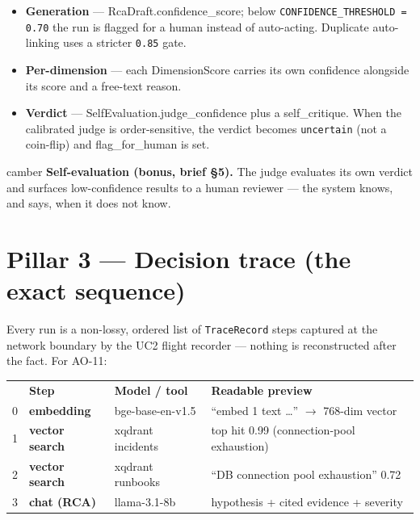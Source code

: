 \documentclass[11pt]{article}
\newcommand{\fld}[1]{{\ttfamily\color{emdark}#1}}
\begin{document}
\begin{itemize}[leftmargin=1.3em,itemsep=2pt]
  \item \textbf{Generation} --- \fld{RcaDraft.confidence\_score}; below
        \texttt{CONFIDENCE\_THRESHOLD = 0.70} the run is flagged for a human instead of
        auto-acting. Duplicate auto-linking uses a stricter \texttt{0.85} gate.
  \item \textbf{Per-dimension} --- each \fld{DimensionScore} carries its own \fld{confidence}
        alongside its score and a free-text \fld{reason}.
  \item \textbf{Verdict} --- \fld{SelfEvaluation.judge\_confidence} plus a \fld{self\_critique}.
        When the calibrated judge is order-sensitive, the verdict becomes \texttt{uncertain}
        (not a coin-flip) and \fld{flag\_for\_human} is set.
\end{itemize}

\begin{notebox}{camber}
\textbf{Self-evaluation (bonus, brief \S5).} The judge evaluates its own verdict and surfaces
low-confidence results to a human reviewer --- the system knows, and says, when it does not know.
\end{notebox}

\section{Pillar 3 --- Decision trace (the exact sequence)}
Every run is a non-lossy, ordered list of \texttt{TraceRecord} steps captured at the network
boundary by the UC2 flight recorder --- nothing is reconstructed after the fact. For AO-11:

\begin{center}
\begin{tabular}{@{}c >{\bfseries}p{2.7cm} p{4.0cm} p{5.4cm}@{}}
\toprule
\rowcolor{headerbg}\multicolumn{1}{@{}>{\color{white}\bfseries}c}{\#} & \color{white}\bfseries Step & \color{white}\bfseries Model / tool & \color{white}\bfseries Readable preview \\
0 & embedding & bge-base-en-v1.5 & ``embed 1 text \dots'' $\to$ 768-dim vector \\
1 & vector search & xqdrant incidents & top hit 0.99 (connection-pool exhaustion) \\
2 & vector search & xqdrant runbooks & ``DB connection pool exhaustion'' 0.72 \\
3 & chat (RCA) & llama-3.1-8b & hypothesis + cited evidence + severity \\
\bottomrule
\end{tabular}
\end{center}
\end{document}
